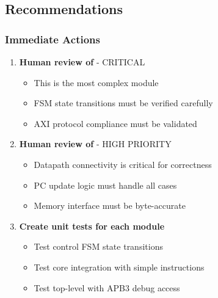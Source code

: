 \subsection{Recommendations}\label{cr:fix:cpu-integration-summary:recommendations}

\subsubsection{Immediate Actions}\label{cr:fix:cpu-integration-summary:immediate-actions}

\begin{record}

\begin{enumerate}
\def\labelenumi{\arabic{enumi}.}
\item
  \textbf{Human review of } - CRITICAL

  \begin{itemize}
  \tightlist
  \item
    This is the most complex module
  \item
    FSM state transitions must be verified carefully
  \item
    AXI protocol compliance must be validated
  \end{itemize}
\item
  \textbf{Human review of } - HIGH PRIORITY

  \begin{itemize}
  \tightlist
  \item
    Datapath connectivity is critical for correctness
  \item
    PC update logic must handle all cases
  \item
    Memory interface must be byte-accurate
  \end{itemize}
\item
  \textbf{Create unit tests for each module}

  \begin{itemize}
  \tightlist
  \item
    Test control FSM state transitions
  \item
    Test core integration with simple instructions
  \item
    Test top-level with APB3 debug access
  \end{itemize}
\end{enumerate}

\end{record}

